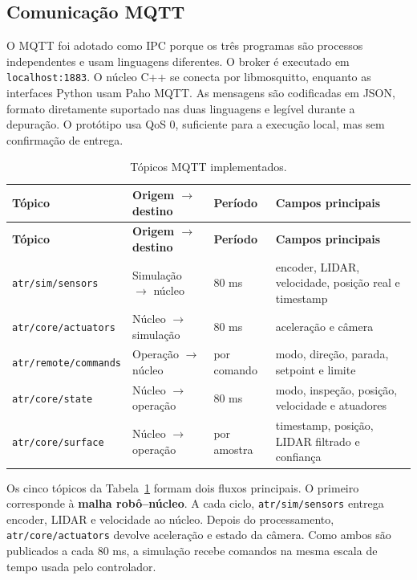 \documentclass[12pt,a4paper]{article}
\begin{document}
\subsection{Comunicação MQTT}

O MQTT foi adotado como IPC porque os três programas são processos independentes e usam linguagens diferentes. O broker é executado em \texttt{localhost:1883}. O núcleo C++ se conecta por libmosquitto, enquanto as interfaces Python usam Paho MQTT. As mensagens são codificadas em JSON, formato diretamente suportado nas duas linguagens e legível durante a depuração. O protótipo usa QoS 0, suficiente para a execução local, mas sem confirmação de entrega.

\begingroup
\small
\begin{longtable}{p{4.2cm}p{3.3cm}p{2.4cm}p{3.4cm}}
\caption{Tópicos MQTT implementados.}
\label{tab:mqtt}\\
\toprule
\textbf{Tópico} & \textbf{Origem $\rightarrow$ destino} & \textbf{Período} & \textbf{Campos principais} \\
\midrule
\endfirsthead
\toprule
\textbf{Tópico} & \textbf{Origem $\rightarrow$ destino} & \textbf{Período} & \textbf{Campos principais} \\
\midrule
\endhead
\texttt{atr/sim/sensors} & Simulação $\rightarrow$ núcleo & 80 ms & encoder, LIDAR, velocidade, posição real e timestamp \\
\texttt{atr/core/actuators} & Núcleo $\rightarrow$ simulação & 80 ms & aceleração e câmera \\
\texttt{atr/remote/commands} & Operação $\rightarrow$ núcleo & por comando & modo, direção, parada, setpoint e limite \\
\texttt{atr/core/state} & Núcleo $\rightarrow$ operação & 80 ms & modo, inspeção, posição, velocidade e atuadores \\
\texttt{atr/core/surface} & Núcleo $\rightarrow$ operação & por amostra & timestamp, posição, LIDAR filtrado e confiança \\
\bottomrule
\end{longtable}
\endgroup

Os cinco tópicos da Tabela~\ref{tab:mqtt} formam dois fluxos principais. O primeiro corresponde à \textbf{malha robô--núcleo}. A cada ciclo, \texttt{atr/sim/sensors} entrega encoder, LIDAR e velocidade ao núcleo. Depois do processamento, \texttt{atr/core/actuators} devolve aceleração e estado da câmera. Como ambos são publicados a cada 80 ms, a simulação recebe comandos na mesma escala de tempo usada pelo controlador.
\end{document}
